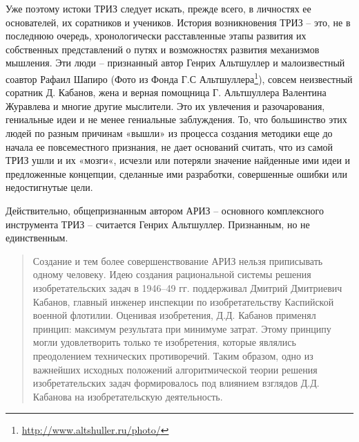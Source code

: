 \documentclass[11pt,a4paper]{article}
\begin{document}
Уже поэтому истоки ТРИЗ следует искать, прежде всего, в личностях ее
основателей, их соратников и учеников. История возникновения ТРИЗ -- это, не в
последнюю очередь, хронологически расставленные этапы развития их собственных
представлений о путях и возможностях развития механизмов мышления. Эти люди --
признанный автор Генрих Альтшуллер и малоизвестный соавтор Рафаил Шапиро (Фото
из Фонда Г.С Альтшуллера\footnote{\url{http://www.altshuller.ru/photo/}}),
совсем неизвестный соратник Д. Кабанов, жена и верная помощница Г. Альтшуллера
Валентина Журавлева и многие другие мыслители. Это их увлечения и
разочарования, гениальные идеи и не менее гениальные заблуждения. То, что
большинство этих людей по разным причинам «вышли» из процесса создания
методики еще до начала ее повсеместного признания, не дает оснований считать,
что из самой ТРИЗ ушли и их «мозги«, исчезли или потеряли значение найденные
ими идеи и предложенные концепции, сделанные ими разработки, совершенные
ошибки или недостигнутые цели.

Действительно, общепризнанным автором АРИЗ -- основного комплексного
инструмента ТРИЗ -- считается Генрих Альтшуллер. Признанным, но не
единственным. 

\begin{quote}
  Создание и тем более совершенствование АРИЗ нельзя приписывать одному
  человеку. Идею создания рациональной системы решения изобретательских задач
  в 1946--49 гг. поддерживал Дмитрий Дмитриевич Кабанов, главный инженер
  инспекции по изобретательству Каспийской военной флотилии. Оценивая
  изобретения, Д.Д. Кабанов применял принцип: максимум результата при минимуме
  затрат. Этому принципу могли удовлетворить только те изобретения, которые
  являлись преодолением технических противоречий. Таким образом, одно из
  важнейших исходных положений алгоритмической теории решения изобретательских
  задач формировалось под влиянием взглядов Д.Д. Кабанова на изобретательскую
  деятельность. \cite{Altshuller1974}
\end{quote}
\end{document}
